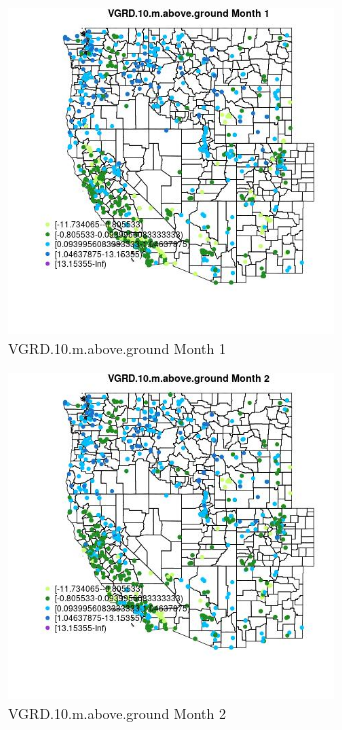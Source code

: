 \begin{figure} 
\centering  
\includegraphics[width=0.77\textwidth]{Code_Outputs/Report_ML_input_PM25_Step4_part_f_de_duplicated_aveswNAs_MapObsMo1VGRD10maboveground.jpg} 
\caption{\label{fig:Report_ML_input_PM25_Step4_part_f_de_duplicated_aveswNAsMapObsMo1VGRD10maboveground}VGRD.10.m.above.ground Month 1} 
\end{figure} 
 

\begin{figure} 
\centering  
\includegraphics[width=0.77\textwidth]{Code_Outputs/Report_ML_input_PM25_Step4_part_f_de_duplicated_aveswNAs_MapObsMo2VGRD10maboveground.jpg} 
\caption{\label{fig:Report_ML_input_PM25_Step4_part_f_de_duplicated_aveswNAsMapObsMo2VGRD10maboveground}VGRD.10.m.above.ground Month 2} 
\end{figure} 
 


